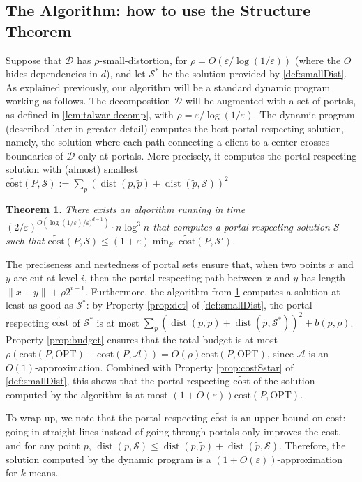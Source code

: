 \documentclass[11pt]{article}
\newtheorem{theorem}{Theorem}[section]
\newcommand{\opt}{\text{OPT}}
\newcommand{\eps}{\varepsilon}
\newcommand{\cost}{\mathrm{cost}}
\renewcommand{\tilde}{\widetilde}
\newcommand{\calD}{\mathcal {D}}
\newcommand{\calS}{\mathcal {S}}
\newcommand{\calL}{\mathcal{A}}
\DeclareMathOperator{\dist}{dist}
\newcommand{\lpar}{\left(}
\newcommand{\rpar}{\right)}
\begin{document}
\subsection{The Algorithm: how to use the Structure Theorem}\label{sec:algo}

Suppose that $\calD$ has $\rho$-small-distortion, for $\rho = O(\eps / \log(1/\eps))$ (where the $O$ hides dependencies in $d$), and let $\calS^*$ be the solution provided by \cref{def:smallDist}. 
As explained previously, our algorithm will be a standard dynamic program working as follows. The decomposition $\calD$ will be augmented with a set of portals, as defined in \cref{lem:talwar-decomp}, with $\rho = \eps / \log(1/\eps)$. 
The dynamic program (described later in greater detail) computes the best portal-respecting solution, namely, the solution where each path connecting a client to a center crosses boundaries of $\calD$ only at portals. More precisely, it computes the portal-respecting solution with (almost) smallest $\tilde{\cost}(P, \calS) := \sum_p (\dist(p, \tilde p) + \dist(\tilde p, \calS))^2$

\begin{theorem}\label{thm:DP}
    There exists an algorithm running in time $(2/\eps)^{O\lpar \log(1/\eps)/\eps)^{d-1}\rpar} \cdot n \log^3 n$ that computes a portal-respecting solution $\calS$ such that $\tilde {\cost}(P, \calS) \leq (1+\eps) \min_{\calS'} \tilde{\cost}(P, \calS')$.
\end{theorem}

The preciseness and nestedness of portal sets ensure that, when two points $x$ and $y$ are cut at level $i$, then the portal-respecting path between $x$ and $y$ has length $\|x-y\| + \rho 2^{i+1}$. 
Furthermore, the algorithm from \cref{thm:DP} computes a solution at least as good as $\calS^*$: by Property \ref{prop:det} of \cref{def:smallDist}, the portal-respecting $\tilde{\cost}$ of $\calS^*$ is at most $\sum_p (\dist(p, \tilde p) + \dist(\tilde p, \calS^*))^2 + b(p, \rho)$.  Property \ref{prop:budget} ensures that the total budget is at most $\rho (\cost(P, \opt) + \cost(P, \calL)) = O(\rho) \cost(P, \opt)$, since $\calL$ is an $O(1)$-approximation. 
Combined with Property \ref{prop:costSstar} of \cref{def:smallDist}, this shows that the portal-respecting $\tilde{\cost}$ of the solution computed by the algorithm is at most $(1+O(\eps))\cost(P, \opt)$. 

To wrap up, we note that the portal respecting $\tilde{\cost}$ is an upper bound on cost: going in straight lines instead of going through portals only improves the cost, and for any point $p$, $\dist(p, \calS) \leq \dist(p, \tilde p) + \dist(\tilde p, \calS)$. Therefore, the solution computed by the dynamic program is a $(1+O(\eps))$-approximation for $k$-means.
\end{document}
